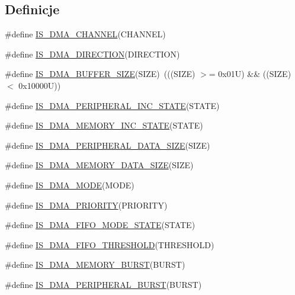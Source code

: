 \subsection*{Definicje}
\begin{DoxyCompactItemize}
\item 
\#define \hyperlink{group___d_m_a___private___macros_gac7f4709d9244f25b853789d888a74d46}{I\+S\+\_\+\+D\+M\+A\+\_\+\+C\+H\+A\+N\+N\+EL}(C\+H\+A\+N\+N\+EL)
\item 
\#define \hyperlink{group___d_m_a___private___macros_gae2b02e8e823854bcd7c5746cdd29e70d}{I\+S\+\_\+\+D\+M\+A\+\_\+\+D\+I\+R\+E\+C\+T\+I\+ON}(D\+I\+R\+E\+C\+T\+I\+ON)
\item 
\#define \hyperlink{group___d_m_a___private___macros_ga72ef4033bb3bc2cdfdbe579083b05e32}{I\+S\+\_\+\+D\+M\+A\+\_\+\+B\+U\+F\+F\+E\+R\+\_\+\+S\+I\+ZE}(S\+I\+ZE)~(((S\+I\+ZE) $>$= 0x01\+U) \&\& ((\+S\+I\+Z\+E) $<$ 0x10000\+U))
\item 
\#define \hyperlink{group___d_m_a___private___macros_ga28762105b3f567c16ba79a47e68ff0fa}{I\+S\+\_\+\+D\+M\+A\+\_\+\+P\+E\+R\+I\+P\+H\+E\+R\+A\+L\+\_\+\+I\+N\+C\+\_\+\+S\+T\+A\+TE}(S\+T\+A\+TE)
\item 
\#define \hyperlink{group___d_m_a___private___macros_gaa880f39d499d1e80449cf80381e4eb67}{I\+S\+\_\+\+D\+M\+A\+\_\+\+M\+E\+M\+O\+R\+Y\+\_\+\+I\+N\+C\+\_\+\+S\+T\+A\+TE}(S\+T\+A\+TE)
\item 
\#define \hyperlink{group___d_m_a___private___macros_gad7916e0ae55cdf5efdfa68a09a028037}{I\+S\+\_\+\+D\+M\+A\+\_\+\+P\+E\+R\+I\+P\+H\+E\+R\+A\+L\+\_\+\+D\+A\+T\+A\+\_\+\+S\+I\+ZE}(S\+I\+ZE)
\item 
\#define \hyperlink{group___d_m_a___private___macros_gac9e3748cebcb16d4ae4206d562bc804c}{I\+S\+\_\+\+D\+M\+A\+\_\+\+M\+E\+M\+O\+R\+Y\+\_\+\+D\+A\+T\+A\+\_\+\+S\+I\+ZE}(S\+I\+ZE)
\item 
\#define \hyperlink{group___d_m_a___private___macros_gad88ee5030574d6a573904378fb62c7ac}{I\+S\+\_\+\+D\+M\+A\+\_\+\+M\+O\+DE}(M\+O\+DE)
\item 
\#define \hyperlink{group___d_m_a___private___macros_gaa1cae2ab458948511596467c87cd02b6}{I\+S\+\_\+\+D\+M\+A\+\_\+\+P\+R\+I\+O\+R\+I\+TY}(P\+R\+I\+O\+R\+I\+TY)
\item 
\#define \hyperlink{group___d_m_a___private___macros_gadb90a893aeb49fd4bc14af750af3837c}{I\+S\+\_\+\+D\+M\+A\+\_\+\+F\+I\+F\+O\+\_\+\+M\+O\+D\+E\+\_\+\+S\+T\+A\+TE}(S\+T\+A\+TE)
\item 
\#define \hyperlink{group___d_m_a___private___macros_gaeafc0d9e327d6e5b26cd37f6744b232f}{I\+S\+\_\+\+D\+M\+A\+\_\+\+F\+I\+F\+O\+\_\+\+T\+H\+R\+E\+S\+H\+O\+LD}(T\+H\+R\+E\+S\+H\+O\+LD)
\item 
\#define \hyperlink{group___d_m_a___private___macros_ga921ebf06447dc036180fff50b7e4846a}{I\+S\+\_\+\+D\+M\+A\+\_\+\+M\+E\+M\+O\+R\+Y\+\_\+\+B\+U\+R\+ST}(B\+U\+R\+ST)
\item 
\#define \hyperlink{group___d_m_a___private___macros_ga7c60961178e2a32e9e364a220a8aca88}{I\+S\+\_\+\+D\+M\+A\+\_\+\+P\+E\+R\+I\+P\+H\+E\+R\+A\+L\+\_\+\+B\+U\+R\+ST}(B\+U\+R\+ST)
\end{DoxyCompactItemize}


